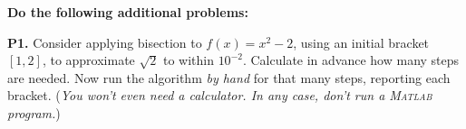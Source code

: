 \documentclass[12pt]{amsart}
\newcommand{\Matlab}{\textsc{Matlab}\xspace}
\begin{document}
\bigskip\bigskip
\noindent \textbf{Do the following additional problems:}

\bigskip
\noindent \textbf{P1.}  Consider applying bisection to $f(x)=x^2-2$, using an initial bracket $[1,2]$, to approximate $\sqrt{2}$ to within $10^{-2}$.  Calculate in advance how many steps are needed.  Now run the algorithm \emph{by hand} for that many steps, reporting each bracket.  (\emph{You won't even need a calculator.  In any case, don't run a \Matlab program.})
\end{document}
